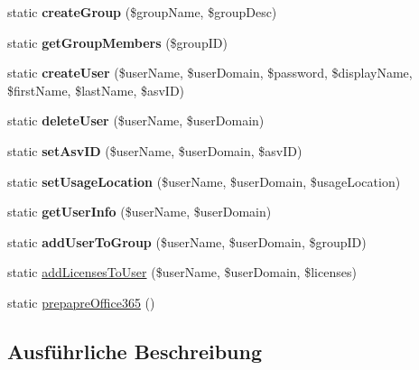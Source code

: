 \begin{DoxyCompactItemize}
static {\bfseries create\+Group} (\$group\+Name, \$group\+Desc)
\item 
\mbox{\label{class_office365_api_ad05b5e14e64e22e904b84dacaf070bc4}} 
static {\bfseries get\+Group\+Members} (\$group\+ID)
\item 
\mbox{\label{class_office365_api_af5e9d8db2ec5ce56ade4a323ea1379ae}} 
static {\bfseries create\+User} (\$user\+Name, \$user\+Domain, \$password, \$display\+Name, \$first\+Name, \$last\+Name, \$asv\+ID)
\item 
\mbox{\label{class_office365_api_ab632ea1e7ddbbd2cd50380213ab02e8b}} 
static {\bfseries delete\+User} (\$user\+Name, \$user\+Domain)
\item 
\mbox{\label{class_office365_api_af8cdee96938c533430d9d3bfa450ae9b}} 
static {\bfseries set\+Asv\+ID} (\$user\+Name, \$user\+Domain, \$asv\+ID)
\item 
\mbox{\label{class_office365_api_aafa2c5a928eea6851264253ea67bfd1a}} 
static {\bfseries set\+Usage\+Location} (\$user\+Name, \$user\+Domain, \$usage\+Location)
\item 
\mbox{\label{class_office365_api_a4b9464d61f5cb8bc42da474983173563}} 
static {\bfseries get\+User\+Info} (\$user\+Name, \$user\+Domain)
\item 
\mbox{\label{class_office365_api_a50bcc9605920661a2b9fbdbb33a1f30d}} 
static {\bfseries add\+User\+To\+Group} (\$user\+Name, \$user\+Domain, \$group\+ID)
\item 
static \mbox{\hyperlink{class_office365_api_a9fb2cb83cc007455725f5214504f7ae3}{add\+Licenses\+To\+User}} (\$user\+Name, \$user\+Domain, \$licenses)
\item 
static \mbox{\hyperlink{class_office365_api_a7fccccdcf17c2774a3b78b963ee305c3}{prepapre\+Office365}} ()
\end{DoxyCompactItemize}


\subsection{Ausführliche Beschreibung}


